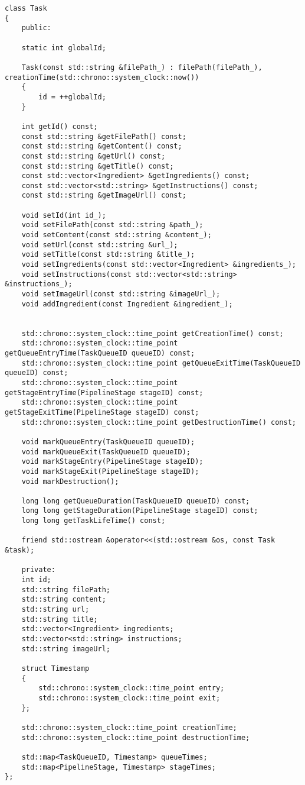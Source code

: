 \begin{center}
	\captionsetup{justification=raggedright,singlelinecheck=off}
	\begin{lstlisting}[caption={Интерфейс класса Task}, label={lst:Task}]
class Task
{
	public:
	
	static int globalId;
	
	Task(const std::string &filePath_) : filePath(filePath_), creationTime(std::chrono::system_clock::now())
	{
		id = ++globalId;
	}
	
	int getId() const;
	const std::string &getFilePath() const;
	const std::string &getContent() const;
	const std::string &getUrl() const;
	const std::string &getTitle() const;
	const std::vector<Ingredient> &getIngredients() const;
	const std::vector<std::string> &getInstructions() const;
	const std::string &getImageUrl() const;
	
	void setId(int id_);
	void setFilePath(const std::string &path_);
	void setContent(const std::string &content_);
	void setUrl(const std::string &url_);
	void setTitle(const std::string &title_);
	void setIngredients(const std::vector<Ingredient> &ingredients_);
	void setInstructions(const std::vector<std::string> &instructions_);
	void setImageUrl(const std::string &imageUrl_);
	void addIngredient(const Ingredient &ingredient_);
	
	
	std::chrono::system_clock::time_point getCreationTime() const;
	std::chrono::system_clock::time_point getQueueEntryTime(TaskQueueID queueID) const;
	std::chrono::system_clock::time_point getQueueExitTime(TaskQueueID queueID) const;
	std::chrono::system_clock::time_point getStageEntryTime(PipelineStage stageID) const;
	std::chrono::system_clock::time_point getStageExitTime(PipelineStage stageID) const;
	std::chrono::system_clock::time_point getDestructionTime() const;
	
	void markQueueEntry(TaskQueueID queueID);
	void markQueueExit(TaskQueueID queueID);
	void markStageEntry(PipelineStage stageID);
	void markStageExit(PipelineStage stageID);
	void markDestruction();
	
	long long getQueueDuration(TaskQueueID queueID) const;
	long long getStageDuration(PipelineStage stageID) const;
	long long getTaskLifeTime() const;
	
	friend std::ostream &operator<<(std::ostream &os, const Task &task);
	
	private:
	int id;
	std::string filePath;
	std::string content;
	std::string url;
	std::string title;
	std::vector<Ingredient> ingredients;
	std::vector<std::string> instructions;
	std::string imageUrl;
	
	struct Timestamp
	{
		std::chrono::system_clock::time_point entry;
		std::chrono::system_clock::time_point exit;
	};
	
	std::chrono::system_clock::time_point creationTime;
	std::chrono::system_clock::time_point destructionTime;
	
	std::map<TaskQueueID, Timestamp> queueTimes;
	std::map<PipelineStage, Timestamp> stageTimes;
};
	\end{lstlisting}
\end{center}


